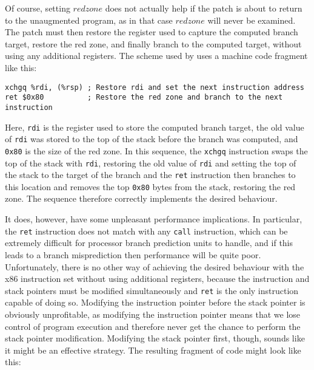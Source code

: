 Of course, setting $redzone$ does not actually help if the patch is
about to return to the unaugmented program, as in that case $redzone$
will never be examined.  The patch must then restore the register used
to capture the computed branch target, restore the red zone, and
finally branch to the computed target, without using any additional
registers.  The scheme used by {\implementation} uses a machine code
fragment like this:

\begin{verbatim}
xchgq %rdi, (%rsp) ; Restore rdi and set the next instruction address
ret $0x80          ; Restore the red zone and branch to the next instruction
\end{verbatim}

  Here, \verb|rdi| is the
register used to store the computed branch target, the old value of
\verb|rdi| was stored to the top of the stack before the branch was
computed, and \verb|0x80| is the size of the red zone.  In this
sequence, the \verb|xchgq| instruction swaps the top of the stack with
\verb|rdi|, restoring the old value of \verb|rdi| and setting the top
of the stack to the target of the branch and the \verb|ret|
instruction then branches to this location and removes the top
\verb|0x80| bytes from the stack, restoring the red zone.  The
sequence therefore correctly implements the desired behaviour.

It does, however, have some unpleasant performance implications.  In
particular, the \verb|ret| instruction does not match with any
\verb|call| instruction, which can be extremely difficult for
processor branch prediction units to handle\needCite{}, and if this
leads to a branch misprediction then performance will be quite poor.
Unfortunately, there is no other way of achieving the desired
behaviour with the x86 instruction set without using additional
registers, because the instruction and stack pointers must be modified
simultaneously and \verb|ret| is the only instruction capable of doing
so.  Modifying the instruction pointer before the stack pointer is
obviously unprofitable, as modifying the instruction pointer means
that we lose control of program execution and therefore never get the
chance to perform the stack pointer modification.  Modifying the stack
pointer first, though, sounds like it might be an effective strategy.
The resulting fragment of code might look like this:

